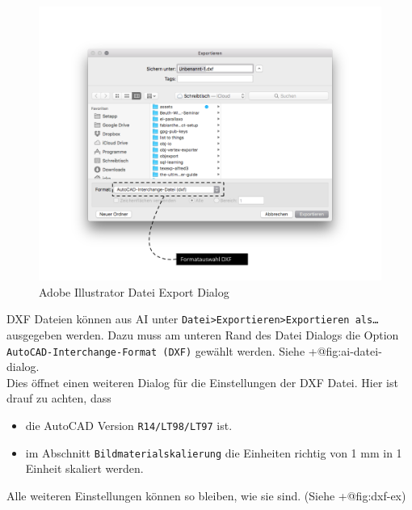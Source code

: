 \documentclass[]{article}
\providecommand{\tightlist}{%
  \setlength{\itemsep}{0pt}\setlength{\parskip}{0pt}}
\begin{document}
\begin{figure}
\hypertarget{fig:ai-datei-dialog}{%
\centering
\includegraphics{assets/images/ai-datei-dialog.png}
\caption{Adobe Illustrator Datei Export
Dialog}\label{fig:ai-datei-dialog}
}
\end{figure}

DXF Dateien können aus AI unter
\texttt{Datei\textgreater{}Exportieren\textgreater{}Exportieren\ als\ldots{}}
ausgegeben werden. Dazu muss am unteren Rand des Datei Dialogs die
Option \texttt{AutoCAD-Interchange-Format\ (DXF)} gewählt werden. Siehe
+@fig:ai-datei-dialog.\\
Dies öffnet einen weiteren Dialog für die Einstellungen der DXF Datei.
Hier ist drauf zu achten, dass

\begin{itemize}
\tightlist
\item
  die AutoCAD Version \texttt{R14/LT98/LT97} ist.
\item
  im Abschnitt \texttt{Bildmaterialskalierung} die Einheiten richtig von
  1 mm in 1 Einheit skaliert werden.
\end{itemize}

Alle weiteren Einstellungen können so bleiben, wie sie sind. (Siehe
+@fig:dxf-ex)
\end{document}
